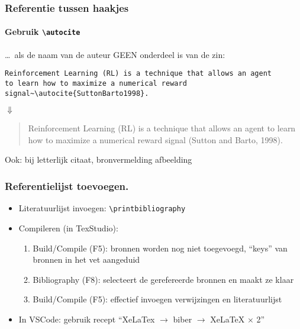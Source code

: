 \documentclass[aspectratio=169]{beamer}
\begin{document}
\begin{frame}[fragile]
  \frametitle{Referentie tussen haakjes}
  \framesubtitle{Gebruik \texttt{\textbackslash{}autocite}}

  \ldots\ als de naam van de auteur GEEN onderdeel is van de zin:

  \medskip

  \small
  \begin{verbatim}
Reinforcement Learning (RL) is a technique that allows an agent
to learn how to maximize a numerical reward
signal~\autocite{SuttonBarto1998}.
\end{verbatim}
  \normalsize

  \begin{center}
    $\Downarrow$
  \end{center}

  \begin{quotation}
    Reinforcement Learning (RL) is a technique that allows an agent to learn how to maximize a numerical reward signal (Sutton and Barto, 1998).
  \end{quotation}

  \bigskip

  Ook: bij letterlijk citaat, bronvermelding afbeelding

\end{frame}

\begin{frame}[fragile]
  \frametitle{Referentielijst toevoegen.}

  \begin{itemize}
    \item Literatuurlijst invoegen: \verb|\printbibliography|

    \item Compileren (in TexStudio):

          \begin{enumerate}
            \item Build/Compile (F5): bronnen worden nog niet toegevoegd, ``keys'' van bronnen in het vet aangeduid
            \item Bibliography (F8): selecteert de gerefereerde bronnen en maakt ze klaar
            \item Build/Compile (F5): effectief invoegen verwijzingen en literatuurlijst
          \end{enumerate}

    \item In VSCode: gebruik recept ``XeLaTex $\rightarrow$ biber $\rightarrow$ XeLaTeX $\times$ 2''
  \end{itemize}
\end{frame}
\end{document}
